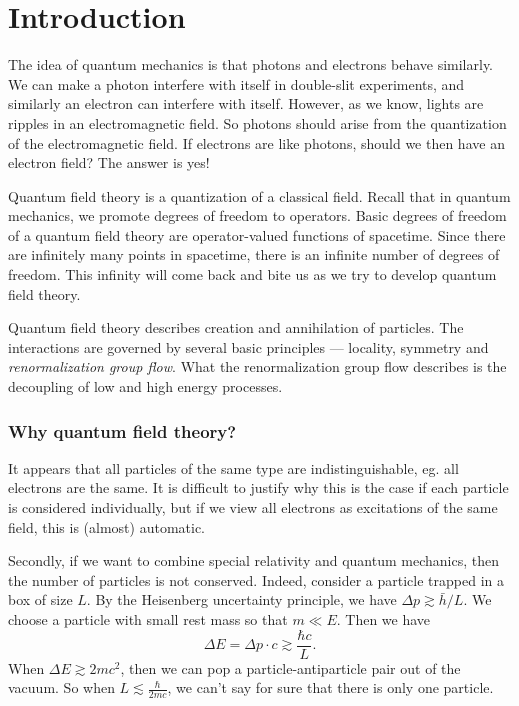 \documentclass[a4paper]{article}
\begin{document}
\setcounter{section}{-1}
\section{Introduction}

The idea of quantum mechanics is that photons and electrons behave similarly. We can make a photon interfere with itself in double-slit experiments, and similarly an electron can interfere with itself. However, as we know, lights are ripples in an electromagnetic field. So photons should arise from the quantization of the electromagnetic field. If electrons are like photons, should we then have an electron field? The answer is yes!

Quantum field theory is a quantization of a classical field. Recall that in quantum mechanics, we promote degrees of freedom to operators. Basic degrees of freedom of a quantum field theory are operator-valued functions of spacetime. Since there are infinitely many points in spacetime, there is an infinite number of degrees of freedom. This infinity will come back and bite us as we try to develop quantum field theory.

Quantum field theory describes creation and annihilation of particles. The interactions are governed by several basic principles --- locality, symmetry and \emph{renormalization group flow}. What the renormalization group flow describes is the decoupling of low and high energy processes.

\subsubsection*{Why quantum field theory?}
It appears that all particles of the same type are indistinguishable, eg. all electrons are the same. It is difficult to justify why this is the case if each particle is considered individually, but if we view all electrons as excitations of the same field, this is (almost) automatic.

Secondly, if we want to combine special relativity and quantum mechanics, then the number of particles is not conserved. Indeed, consider a particle trapped in a box of size $L$. By the Heisenberg uncertainty principle, we have $\Delta p \gtrsim \bar{h}/L$. We choose a particle with small rest mass so that $m \ll E$. Then we have
\[
  \Delta E = \Delta p \cdot c \gtrsim \frac{\hbar c}{L}.
\]
When $\Delta E \gtrsim 2 mc^2$, then we can pop a particle-antiparticle pair out of the vacuum. So when $L \lesssim \frac{\hbar}{2mc}$, we can't say for sure that there is only one particle.
\end{document}
